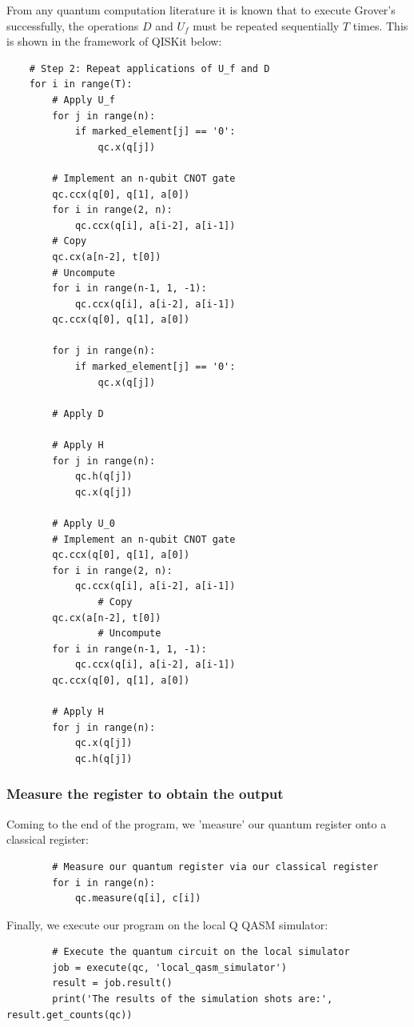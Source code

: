 From any quantum computation literature it is known that to execute Grover's successfully, the operations $D$ and $U_{f}$ must be repeated sequentially $T$ times. This is shown in the framework of QISKit below:

\begin{verbatim}	
	# Step 2: Repeat applications of U_f and D
	for i in range(T):
		# Apply U_f 
		for j in range(n):
			if marked_element[j] == '0':
				qc.x(q[j])	
		
		# Implement an n-qubit CNOT gate
		qc.ccx(q[0], q[1], a[0])
		for i in range(2, n):
			qc.ccx(q[i], a[i-2], a[i-1])
		# Copy
		qc.cx(a[n-2], t[0])
		# Uncompute
		for i in range(n-1, 1, -1):
			qc.ccx(q[i], a[i-2], a[i-1])
		qc.ccx(q[0], q[1], a[0])
		
		for j in range(n):
			if marked_element[j] == '0':
				qc.x(q[j])
		
		# Apply D
		
		# Apply H
		for j in range(n):
			qc.h(q[j])
			qc.x(q[j])
		
		# Apply U_0
		# Implement an n-qubit CNOT gate
		qc.ccx(q[0], q[1], a[0])
		for i in range(2, n):
			qc.ccx(q[i], a[i-2], a[i-1])
                # Copy
		qc.cx(a[n-2], t[0])
                # Uncompute
		for i in range(n-1, 1, -1):
			qc.ccx(q[i], a[i-2], a[i-1])
		qc.ccx(q[0], q[1], a[0])
		
		# Apply H
		for j in range(n):
			qc.x(q[j])
			qc.h(q[j])
\end{verbatim}

\subsubsection{Measure the register to obtain the output}

Coming to the end of the program, we 'measure' our quantum register onto a classical register:

\begin{verbatim}	
		# Measure our quantum register via our classical register
		for i in range(n):
			qc.measure(q[i], c[i])
\end{verbatim}

Finally, we execute our program on the local Q QASM simulator:

\begin{verbatim}
		# Execute the quantum circuit on the local simulator
		job = execute(qc, 'local_qasm_simulator')
		result = job.result()
		print('The results of the simulation shots are:', result.get_counts(qc))
\end{verbatim}

